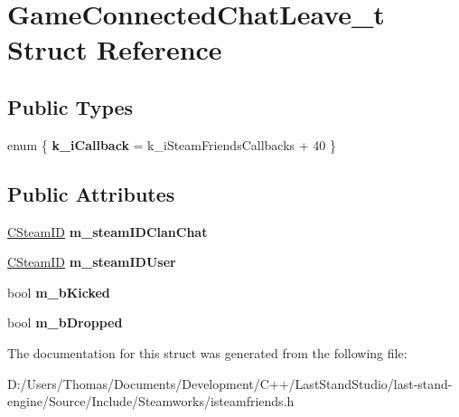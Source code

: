 \hypertarget{structGameConnectedChatLeave__t}{}\section{Game\+Connected\+Chat\+Leave\+\_\+t Struct Reference}
\label{structGameConnectedChatLeave__t}
\subsection*{Public Types}
\begin{DoxyCompactItemize}
\item 
\hypertarget{structGameConnectedChatLeave__t_a92b794f6c13e5e1f0dcdcad2d6b63eee}{}enum \{ {\bfseries k\+\_\+i\+Callback} = k\+\_\+i\+Steam\+Friends\+Callbacks + 40
 \}\label{structGameConnectedChatLeave__t_a92b794f6c13e5e1f0dcdcad2d6b63eee}

\end{DoxyCompactItemize}
\subsection*{Public Attributes}
\begin{DoxyCompactItemize}
\item 
\hypertarget{structGameConnectedChatLeave__t_a16f82e047564da7b8b55ce8265c478fc}{}\hyperlink{classCSteamID}{C\+Steam\+I\+D} {\bfseries m\+\_\+steam\+I\+D\+Clan\+Chat}\label{structGameConnectedChatLeave__t_a16f82e047564da7b8b55ce8265c478fc}

\item 
\hypertarget{structGameConnectedChatLeave__t_a8e8c555897153307e0447214749f4e04}{}\hyperlink{classCSteamID}{C\+Steam\+I\+D} {\bfseries m\+\_\+steam\+I\+D\+User}\label{structGameConnectedChatLeave__t_a8e8c555897153307e0447214749f4e04}

\item 
\hypertarget{structGameConnectedChatLeave__t_a0f4c30e4732ea48e8dec36878f6e292e}{}bool {\bfseries m\+\_\+b\+Kicked}\label{structGameConnectedChatLeave__t_a0f4c30e4732ea48e8dec36878f6e292e}

\item 
\hypertarget{structGameConnectedChatLeave__t_a2905e3028f25c9062e295570a6f68fee}{}bool {\bfseries m\+\_\+b\+Dropped}\label{structGameConnectedChatLeave__t_a2905e3028f25c9062e295570a6f68fee}

\end{DoxyCompactItemize}


The documentation for this struct was generated from the following file\+:\begin{DoxyCompactItemize}
\item 
D\+:/\+Users/\+Thomas/\+Documents/\+Development/\+C++/\+Last\+Stand\+Studio/last-\/stand-\/engine/\+Source/\+Include/\+Steamworks/isteamfriends.\+h\end{DoxyCompactItemize}
